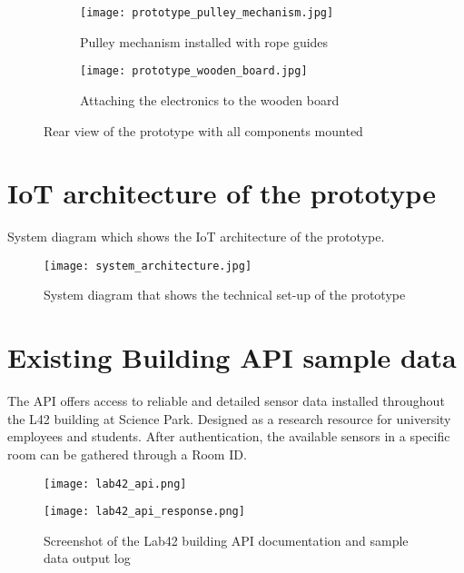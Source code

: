 \begin{appendices}
\begin{figure}[htbp]
    \centering
    \begin{subfigure}{0.48\textwidth}
        \centering
        \texttt{[image: prototype\_pulley\_mechanism.jpg]}
        \caption{Pulley mechanism installed with rope guides}
        \label{fig:image1}
    \end{subfigure}
    \hfill
    \begin{subfigure}{0.48\textwidth}
        \centering
        \texttt{[image: prototype\_wooden\_board.jpg]}
        \caption{Attaching the electronics to the wooden board}
        \label{fig:image2}
    \end{subfigure}
    \caption{Rear view of the prototype with all components mounted}
    \label{fig:grid}
\end{figure}

\section{IoT architecture of the prototype}
\label{appendix:architecture}

System diagram which shows the IoT architecture of the prototype.

\begin{figure}[H]
    \centering
    \texttt{[image: system\_architecture.jpg]}
    \caption{System diagram that shows the technical set-up of the prototype}
    \label{fig:timeline}
\end{figure}

\section{Existing Building API sample data}
\label{appendix:architecture}

The API offers access to reliable and detailed sensor data installed throughout the L42 building at Science Park. Designed as a research resource for university employees and students. After authentication, the available sensors in a specific room can be gathered through a Room ID.



\begin{figure}[H]
    \centering
    \begin{minipage}{0.7\textwidth}
        \centering
        \texttt{[image: lab42\_api.png]}
    \end{minipage}%
    \begin{minipage}{0.3\textwidth}
        \centering
        \texttt{[image: lab42\_api\_response.png]}
    \end{minipage}
    \caption{Screenshot of the Lab42 building API documentation and sample data output log}
    \label{fig:timeline}
\end{figure}


\end{appendices}
